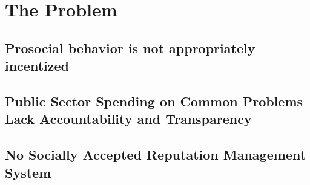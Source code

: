 \section{\textbf{The Problem}}

\subsection{Prosocial behavior is not appropriately incentized}

\subsection{Public Sector Spending on Common Problems Lack Accountability and Transparency}

\subsection{No Socially Accepted Reputation Management System}

\newpage
\newpage


